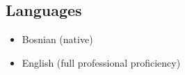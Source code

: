 \documentclass[margin]{res}
\begin{document}
\begin{resume}
\section{Languages}
\begin{itemize}[label={}, leftmargin=0cm, itemsep=0cm]
  \item Bosnian (native)
  \item English (full professional proficiency)
\end{itemize}

\end{resume}
\end{document}
